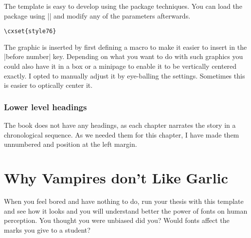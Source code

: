 The template is easy to develop using the  package techniques. You can load the package using
|\cxsetstyle| and modify any of the parameters afterwards.

\begin{verbatim}
\cxset{style76}
\end{verbatim}

The graphic is inserted by first defining a macro to make it easier to insert in the |before number| key. Depending on what you want to do with such graphics you could also have it in a box or a minipage to enable it to be vertically centered exactly. I opted to manually adjust it by eye-balling the settings. Sometimes this is easier to    optically center it. 

\subsection{Lower level headings}

The book does not have any headings, as each chapter narrates the story in a chronological sequence. As we needed them for this chapter, I have made them unnumbered and position at the left margin.





\chapter{Why Vampires don’t Like Garlic}

When you feel bored and have nothing to do, run your thesis with this template and see how it looks and you will understand better the power of fonts on human perception. You thought you were unbiased did you? Would fonts affect the marks you give to a student?














\makeatother
